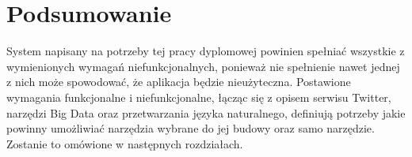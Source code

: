 \section{Podsumowanie}
System napisany na potrzeby tej pracy dyplomowej powinien spełniać wszystkie z wymienionych wymagań niefunkcjonalnych, ponieważ nie spełnienie nawet jednej z nich może spowodować, że aplikacja będzie nieużyteczna. Postawione wymagania funkcjonalne i niefunkcjonalne, łącząc się z opisem serwisu Twitter, narzędzi Big Data oraz przetwarzania języka naturalnego, definiują potrzeby jakie powinny umożliwiać narzędzia wybrane do jej budowy oraz samo narzędzie. Zostanie to omówione w następnych rozdziałach.

